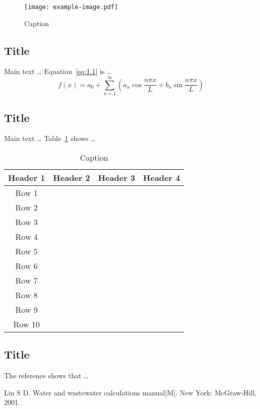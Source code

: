 \documentclass[degree=doctor,language=english]{thuthesis}
\begin{document}
\begin{figure}
  \centering
  \texttt{[image: example-image.pdf]}
  \caption{Caption}
  \label{fig:1.1}
\end{figure}

\subsection{Title}

Main text … Equation~\eqref{eq:1.1} is …
\begin{equation}
  f(x) = a_0 + \sum_{n=1}^\infty \left( a_n \cos⁡ \frac{n \pi x}{L}
    + b_n \sin⁡ \frac{n \pi x}{L} \right)
  \label{eq:1.1}
\end{equation}

\subsection{Title}

Main text … Table~\ref{tab:1.1} shows …

\begin{table}
  \centering
  \caption{Caption}
  \label{tab:1.1}
  \begin{tabular}{cccc}
    \toprule
    Header 1 & Header 2 & Header 3 & Header 4 \\
    \midrule
    Row 1 &  &  & \\
    Row 2 &  &  & \\
    Row 3 &  &  & \\
    Row 4 &  &  & \\
    Row 5 &  &  & \\
    Row 6 &  &  & \\
    Row 7 &  &  & \\
    Row 8 &  &  & \\
    Row 9 &  &  & \\
    Row 10 &  &  & \\
    \bottomrule
  \end{tabular}
\end{table}

\subsection{Title}

The reference\cite{bib1} shows that \dots



% 

\begin{thebibliography}{9}
   Lin S D. Water and wastewater calculations manual[M]. New York: McGraw-Hill, 2001.

\end{thebibliography}
\end{document}
